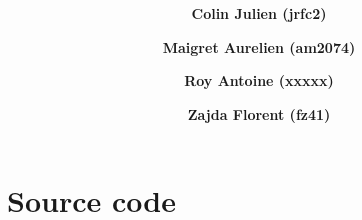 \documentclass[12pt]{article}
\title{
\vspace{2in}
\Huge{\textmd{\textbf{\hmwkTitle}}}
\vspace{3in}
}
\author{
	\textbf{Colin Julien (jrfc2)}
	\and
	\textbf{Maigret Aurelien (am2074)}
	\and
	\textbf{Roy Antoine (xxxxx)}
	\and
	\textbf{Zajda Florent (fz41)}
}
\date{\hmwkDueDate}
\begin{document}
\maketitle




\newpage






\section{Source code}
\end{document}
